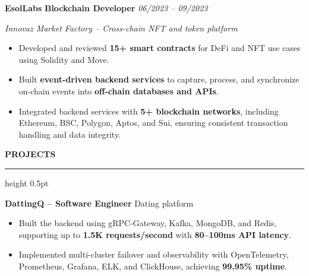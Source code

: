 \documentclass[a4paper,10pt]{article}
\newcommand{\cvsection}[1]{%
    \par
    \vspace{4pt}%
    \noindent
    {\normalsize\textbf{#1}}%
    \par
    \vspace{1pt}%
    \hrule height 0.5pt
    \vspace{2.5pt}%
}
\newcommand{\experience}[3]{%
    \noindent
    \textbf{#1}
    \hspace{3pt}\textbar\hspace{3pt}
    \textbf{#2}
    \hfill
    \textit{#3}
    \par
}
\newcommand{\companydesc}[1]{%
    \vspace{0.8pt}
    {\small\textit{#1}}
    \par
    \vspace{-0.6pt}
}
\newcommand{\project}[2]{%
    \noindent
    \textbf{#1}
    \hspace{3pt}\textbar\hspace{3pt}
    #2
    \par
}
\newcommand{\jobspace}{%
    \vspace{2pt}
}
\begin{document}

\jobspace


\experience
{EsolLabs}
{Blockchain Developer}
{06/2023 -- 09/2023}

\companydesc{
Innovaz Market Factory -- Cross-chain NFT and token platform
}

\begin{itemize}

    \item Developed and reviewed
    \textbf{15+ smart contracts}
    for DeFi and NFT use cases using Solidity and Move.

    \item Built \textbf{event-driven backend services}
    to capture, process, and synchronize on-chain events
    into \textbf{off-chain databases and APIs}.

    \item Integrated backend services with
    \textbf{5+ blockchain networks}, including Ethereum,
    BSC, Polygon, Aptos, and Sui, ensuring consistent
    transaction handling and data integrity.

\end{itemize}


\cvsection{PROJECTS}


\project
{DattingQ -- Software Engineer}
{Dating platform}

\begin{itemize}

    \item Built the backend using gRPC-Gateway, Kafka,
    MongoDB, and Redis, supporting up to
    \textbf{1.5K requests/second} with
    \textbf{80--100ms API latency}.

    \item Implemented multi-cluster failover and
    observability with OpenTelemetry, Prometheus,
    Grafana, ELK, and ClickHouse, achieving
    \textbf{99.95\% uptime}.

\end{itemize}
\end{document}
